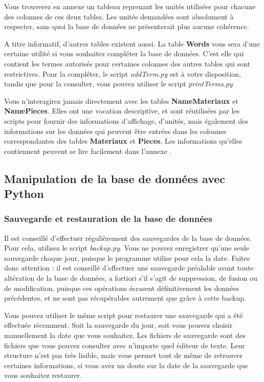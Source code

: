 \documentclass[12pt,a4paper]{article}
\begin{document}
        Vous trouverez en annexe un tableau reprenant les unités utilisées pour chacune des colonnes de ces deux tables.
        Les unités demandées sont absolument à respecter, sans quoi la base de données ne présenterait plus aucune cohérence.

        A titre informatif, d'autres tables existent aussi.
        La table \textbf{Words} vous sera d'une certaine utilité si vous souhaitez
        compléter la base de données. C'est elle qui contient les termes autorisés
        pour certaines colonnes des autres tables qui sont restrictives. Pour la
        compléter, le script \emph{addTerm.py} est à votre disposition, tandis que pour
        la consulter, vous pouvez utiliser le script \emph{printTerms.py}

        Vous n'interagirez jamais directement avec les tables \textbf{NameMateriaux}
        et \textbf{NamePieces}. Elles ont une vocation descriptive, et sont réutilisées
        par les scripts pour fournir des informations d'affichage, d'unités, mais également des
        informations sur les données qui peuvent être entrées dans les colonnes correspondantes
        des tables \textbf{Materiaux} et \textbf{Pieces}.
        Les informations qu'elles contiennent peuvent se lire facilement dans l'annexe
        .

    \bigskip
    \subsection{Manipulation de la base de données avec Python}
        \subsubsection{Sauvegarde et restauration de la base de données}\label{sauvegarde}

            Il est conseillé d'effectuer régulièrement des sauvegardes de la base de données.
            Pour cela, utilisez le script \emph{backup.py}. Vous ne pouvez enregistrer qu'une seule sauvegarde
            chaque jour, puisque le programme utilise pour cela la date. Faites donc attention : il est conseillé d'effectuer
            une sauvegarde préalable avant toute altération de la base de données, a fortiori s'il s'agit de suppression,
            de fusion ou de modification, puisque ces opérations écrasent définitivement les données précédentes, et ne sont
            pas récupérables autrement que grâce à cette backup.

            Vous pouvez utiliser le même script pour restaurer une sauvegarde qui a été effectuée récemment. Soit la sauvegarde
            du jour, soit vous pouvez choisir manuellement la date que vous souhaitez.
            Les fichiers de sauvegarde sont des fichiers que vous pouvez consulter avec n'importe quel éditeur de texte.
            Leur structure n'est pas très lisible, mais vous permet tout de même de retrouver certaines informations, si vous
            avez un doute sur la date de la sauvegarde que vous souhaitez restaurer.
\end{document}
